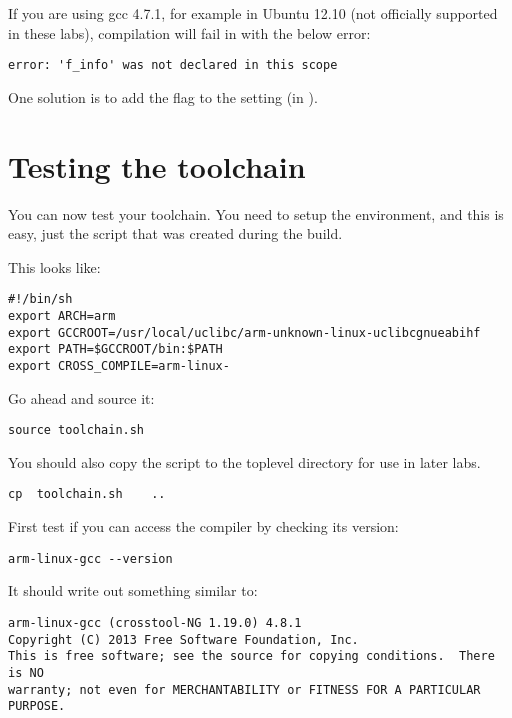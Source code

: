 If you are using gcc 4.7.1, for example in Ubuntu 12.10 (not officially
supported in these labs), compilation will fail in  with
the below error:

\begin{verbatim}
error: 'f_info' was not declared in this scope
\end{verbatim}

One solution is to add the  flag to the
 setting (in ). 
\clearpage

\section{Testing the toolchain}

You can now test your toolchain. 
You need to setup the environment, and this is easy,
just   the  script that was created during the build.

This looks like:

\begin{verbatim}
#!/bin/sh
export ARCH=arm
export GCCROOT=/usr/local/uclibc/arm-unknown-linux-uclibcgnueabihf
export PATH=$GCCROOT/bin:$PATH
export CROSS_COMPILE=arm-linux-
\end{verbatim}

Go ahead and source it:

\begin{verbatim}
source toolchain.sh
\end{verbatim}


You should also copy the script to the toplevel directory for use in later labs.

\begin{verbatim}
cp	toolchain.sh	..
\end{verbatim}

First test if you can access the compiler by checking its version:

\begin{verbatim}
arm-linux-gcc --version
\end{verbatim}

It should write out something similar to:
\begin{verbatim}
arm-linux-gcc (crosstool-NG 1.19.0) 4.8.1
Copyright (C) 2013 Free Software Foundation, Inc.
This is free software; see the source for copying conditions.  There is NO
warranty; not even for MERCHANTABILITY or FITNESS FOR A PARTICULAR PURPOSE.

\end{verbatim}

